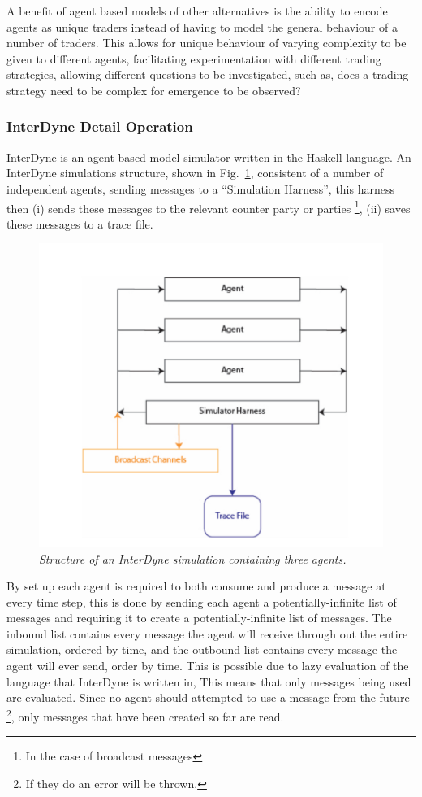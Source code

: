 \documentclass{article}
\begin{document}
A benefit of agent based models of other alternatives is the ability to encode agents as unique traders instead of having to model the general behaviour of a number of traders. This allows for unique behaviour of varying complexity to be given to different agents, facilitating experimentation with different trading strategies, allowing different questions to be investigated, such as, does a trading strategy need to be complex for emergence to be observed? 




\subsubsection{InterDyne Detail Operation}
InterDyne is an agent-based model simulator written in the Haskell language. An InterDyne simulations structure, shown in Fig.~\ref{fig:harness_setupfigure}, consistent of a number of independent agents, sending messages to a ``Simulation Harness'', this harness then (i) sends these messages to the relevant counter party or parties \footnote{In the case of broadcast messages}, (ii) saves these messages to a trace file.   
\begin{figure}[H]
	\centering
	\includegraphics[scale=0.5]{harness_setup}
	\caption{\it Structure of an InterDyne simulation containing three agents.}
	\label{fig:harness_setupfigure}
\end{figure} 
By set up each agent is required to both consume and produce a message at every time step, this is done by sending each agent a potentially-infinite list of messages and requiring it to create a potentially-infinite list of messages. The inbound list contains every message the agent will receive through out the entire simulation, ordered by time, and the outbound list contains every message the agent will ever send, order by time. This is possible due to lazy evaluation of the language that InterDyne is written in, This means that only messages being used are evaluated. Since no agent should attempted to use a message from the future \footnote{If they do an error will be thrown.}, only messages that have been created so far are read.\\
\end{document}
